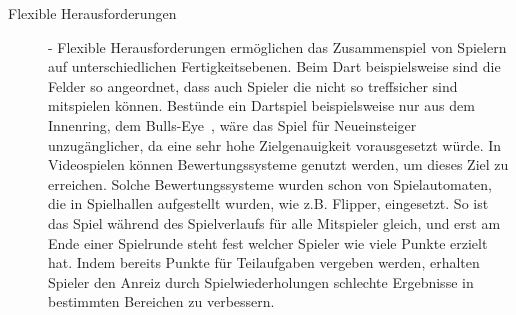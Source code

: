\begin{description}
\begin{itemize}
\end{itemize}


\item[Flexible Herausforderungen] - Flexible Herausforderungen ermöglichen das Zusammenspiel von Spielern auf unterschiedlichen Fertigkeitsebenen. Beim Dart beispielsweise sind die Felder so angeordnet, dass auch Spieler die nicht so treffsicher sind mitspielen können. Bestünde ein Dartspiel beispielsweise nur aus dem Innenring, dem \glqq Bulls-Eye\grqq\ , wäre das Spiel für Neueinsteiger unzugänglicher, da eine sehr hohe Zielgenauigkeit vorausgesetzt würde. In Videospielen können Bewertungssysteme genutzt werden, um dieses Ziel zu erreichen. Solche Bewertungssysteme wurden schon von Spielautomaten, die in Spielhallen aufgestellt wurden, wie z.B. Flipper, eingesetzt. So ist das Spiel während des Spielverlaufs für alle Mitspieler gleich, und erst am Ende einer Spielrunde steht fest welcher Spieler wie viele Punkte erzielt hat. Indem bereits Punkte für Teilaufgaben vergeben werden, erhalten Spieler den Anreiz durch Spielwiederholungen schlechte Ergebnisse in bestimmten Bereichen zu verbessern. \cite[S. 71]{Adams:1515529}


\end{description}
